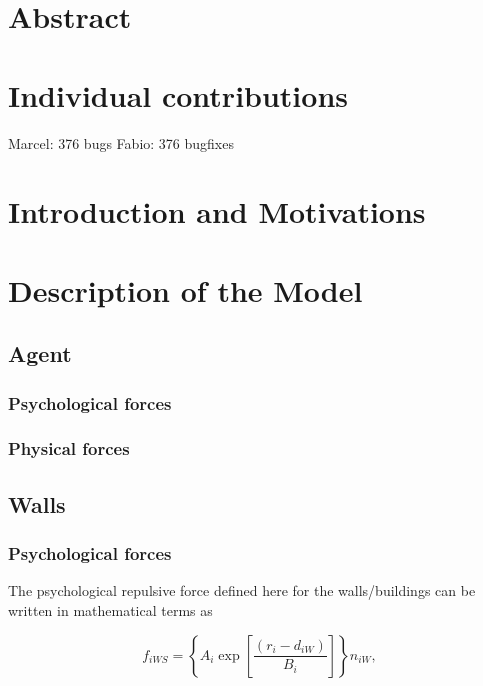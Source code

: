 \documentclass[11pt]{article}
\begin{document}
\tableofcontents

\newpage




\section{Abstract}



\section{Individual contributions}
Marcel: 376 bugs
Fabio: 376 bugfixes

\section{Introduction and Motivations}

\section{Description of the Model}

\subsection{Agent}
\subsubsection{Psychological forces}

\subsubsection{Physical forces}


\subsection{Walls}

\subsubsection{Psychological forces}

The psychological repulsive force defined here for the walls/buildings can be written in mathematical terms as

\begin{equation}
	{f_{iWS}} = \left\{ {{A_i}\exp \left[ {\frac{{\left( {{r_i} - {d_{iW}}} \right)}}{{{B_i}}}} \right]} \right\}{n_{iW}} ,
	\label{eq:fiWS}
\end{equation}
\end{document}
